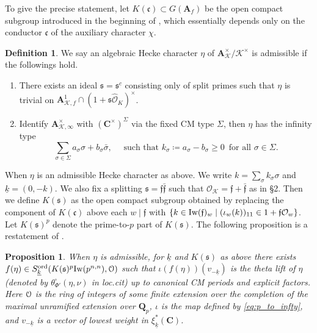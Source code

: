 \documentclass[leqno]{amsart}
\newtheorem{prop}[thm]{Proposition}
\theoremstyle{definition}
\newtheorem{defn}[thm]{Definition}
\theoremstyle{remark}
\newcommand{\oo}{\mathcal{O}}
\newcommand{\eo}{\EuScript{O}}
\newcommand{\Qp}{\mathbf{Q}_p}
\newcommand{\C}{\mathbf C}
\newcommand{\A}{\mathbf A}
\newcommand{\fc}{\mathfrak{c}}
\newcommand{\ff}{\mathfrak{f}}
\newcommand{\fs}{\mathfrak{s}}
\newcommand{\K}{{\mathcal{K}}} %
\newcommand{\wt}[1]{\underline{ #1 }}
\newcommand{\Iw}{\textnormal{Iw}} %
\newcommand{\ord}{\textnormal{ord}} %
\begin{document}
To give the precise statement,
let $K(\fc)\subset G(\A_f)$
be the open compact subgroup 
introduced in the beginning of \cite[\S 6]{lee},
which essentially depends only on the conductor 
$\fc$ of the auxiliary character $\chi$.

\begin{defn}\label{def:admchar}
We say an algebraic Hecke character $\eta$ 
of $\A_\K^\times/\K^\times$ is admissible
if the followings hold.
\begin{enumerate}
\item 
There exists an ideal $\fs=\fs^c$
consisting only of split primes such that 
$\eta$ is trivial on
$\A_{\K,f}^1\cap (1+\fs\widehat{\oo}_K)^\times$.
\item 
Identify $\A_{\K,\infty}^\times$ with $(\C^\times)^\Sigma$
via the fixed CM type $\Sigma$, then $\eta$ has the infinity type
\begin{equation}
\sum_{\sigma\in\Sigma}a_\sigma\sigma+b_\sigma\bar{\sigma},\quad
\text{ such that }
k_\sigma\coloneqq a_\sigma-b_\sigma\geq0\,
\text{ for all }\sigma\in\Sigma.
\end{equation}
\end{enumerate}
\end{defn}

When $\eta$ is an admissible Hecke character as above.
We write $k=\sum_{\sigma}k_\sigma\sigma$ and
$\wt{k}=(0,-k)$.
We also fix a splitting $\fs=\ff\bar{\ff}$
such that $\oo_\K=\ff+\bar{\ff}$ as in \S 2.
Then we define $K(\fs)$ as the open compact subgroup
obtained by replacing the component of $K(\fc)$ above 
each $w\mid \ff$ with 
$\{k\in \Iw(\ff)_w\mid (\iota_w(k))_{11}\in 1+\ff\oo_w\}$.
Let $K(\fs)^p$ denote the prime-to-$p$ part of $K(\fs)$.
The following proposition is a restatement 
of \cite[Prop. 7.5]{lee}.

\begin{prop}
When $\eta$ is admissible,
for $\wt{k}$ and $K(\fs)$ as above
there exists 
$f(\eta)\in S_{\wt{k}}^{\ord}(K(\fs)^p\Iw(p^{n,n}),\eo)$
such that $\iota(f(\eta))(v_{-\wt{k}})$
is the theta lift of $\eta$
(denoted by $\theta^\square_{\Phi'}(\eta,\nu)$
in \textit{loc.cit})
up to canonical CM periods
and explicit factors.
Here $\eo$
is the ring of integers
of some finite extension 
over the completion
of the maximal unramified extension
over $\Qp$,
$\iota$ is the map defined by \eqref{eq:p_to_infty},
and $v_{-\wt{k}}$ is a vector of lowest weight
in $\xi_{\wt{k}}^*(\C)$.
\end{prop}
\end{document}
